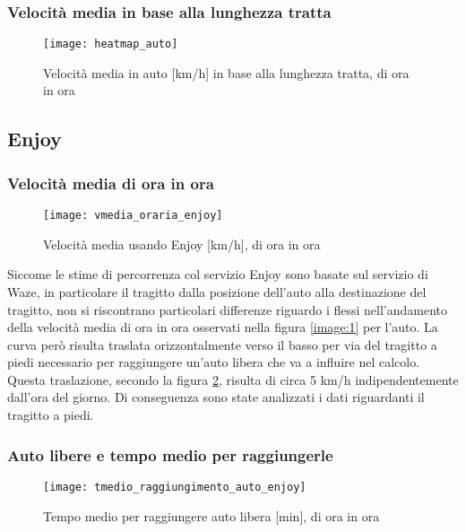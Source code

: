 \subsubsection{Velocità media in base alla lunghezza tratta}

\begin{center}
\begin{figure}
	\texttt{[image: heatmap\_auto]}
	\caption{Velocità media in auto [km/h] in base alla lunghezza tratta, di ora in ora}
	\label{image:12}
\end{figure}
\end{center}


\subsection{Enjoy}

\subsubsection{Velocità media di ora in ora}

\begin{figure}[H]
	\texttt{[image: vmedia\_oraria\_enjoy]}
	\caption{Velocità media usando Enjoy [km/h], di ora in ora}
	\label{image:4}
\end{figure}

Siccome le stime di percorrenza col servizio Enjoy sono basate sul servizio di Waze, in particolare il tragitto dalla posizione dell'auto alla destinazione del tragitto, non si riscontrano particolari differenze riguardo i flessi nell'andamento della velocità media di ora in ora osservati nella figura \ref{image:1} per l'auto. La curva però risulta traslata orizzontalmente verso il basso per via del tragitto a piedi necessario per raggiungere un'auto libera che va a influire nel calcolo. Questa traslazione, secondo la figura \ref{image:4}, risulta di circa 5 km/h indipendentemente dall'ora del giorno. Di conseguenza sono state analizzati i dati riguardanti il tragitto a piedi.

\subsubsection{Auto libere e tempo medio per raggiungerle}

\begin{figure}[H]
	\texttt{[image: tmedio\_raggiungimento\_auto\_enjoy]}
	\caption{Tempo medio per raggiungere auto libera [min], di ora in ora}
	\label{image:5}
\end{figure}

